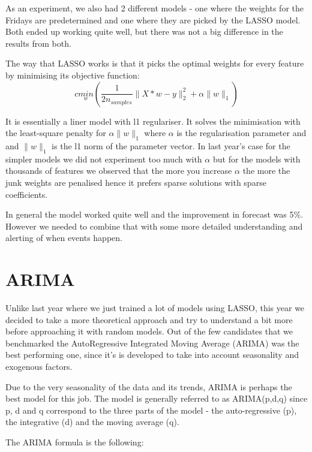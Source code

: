 \documentclass[minf,twoside,singlespacing,parskip,frontabs,notimes,12pt]{infthesis} %
\begin{document}
As an experiment, we also had 2 different models - one where the weights for the Fridays are predetermined and one where they are picked by the LASSO model. Both ended up working quite well, but there was not a big difference in the results from both. 

The way that LASSO works is that it picks the optimal weights for every feature by minimising its objective function:
\begin{equation}c
\underset{w}{min}({\frac{1}{2n_{samples}}} \|X*w - y \|_2^2 + \alpha\|w\|_1)
\end{equation}

It is essentially a liner model with l1 regulariser. It solves the minimisation with the least-square penalty for $\alpha\|w\|_1$ where $\alpha$ is the regularisation parameter and and $\|w\|_1$ is the l1 norm of the parameter vector. In last year's case for the simpler models we did not experiment too much with $\alpha$ but for the models with thousands of features we observed that the more you increase $\alpha$ the more the junk weights are penalised hence it prefers sparse solutions with sparse coefficients. 

In general the model worked quite well and the improvement in forecast was 5\%. However we needed to combine that with some more detailed understanding and alerting of when events happen. 



\section{ARIMA}

Unlike last year where we just trained a lot of models using LASSO, this year we decided to take a more theoretical approach and try to understand a bit more before approaching it with random models. Out of the few candidates that we benchmarked the AutoRegressive Integrated Moving Average (ARIMA) was the best performing one, since it's is developed to take into account seasonality and exogenous factors. 

Due to the very seasonality of the data and its trends, ARIMA is perhaps the best model for this job. The model is generally referred to as ARIMA(p,d,q) since p, d and q correspond to the three parts of the model - the auto-regressive (p), the integrative (d) and the moving average (q).

The ARIMA formula is the following:
\end{document}
